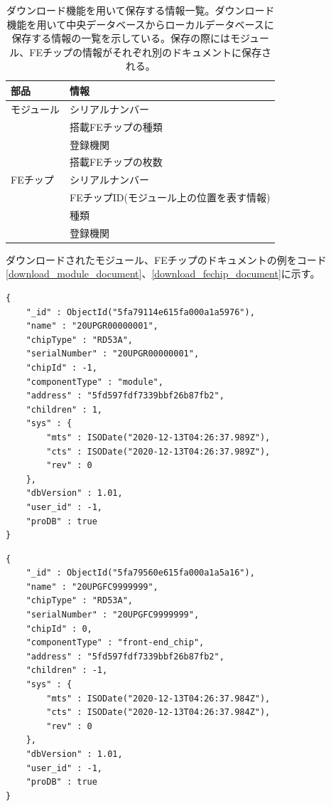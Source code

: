 \begin{table}[tbp]
\begin{center}
\caption[ダウンロード機能を用いて保存する情報一覧。]{ダウンロード機能を用いて保存する情報一覧。ダウンロード機能を用いて中央データベースからローカルデータベースに保存する情報の一覧を示している。保存の際にはモジュール、FEチップの情報がそれぞれ別のドキュメントに保存される。}
\label{download_information}
  \small
  \begin{tabular}{|ll|} \hline
    部品 & 情報 \\ \hline
    モジュール & シリアルナンバー \\ 
     & 搭載FEチップの種類  \\ 
     & 登録機関  \\ 
     & 搭載FEチップの枚数  \\ \hline 
    FEチップ & シリアルナンバー \\
     & FEチップID(モジュール上の位置を表す情報) \\  
     & 種類 \\ 
     & 登録機関 \\ \hline 
  \end{tabular}
\end{center}
\end{table}

ダウンロードされたモジュール、FEチップのドキュメントの例をコード\ref{download_module_document}、\ref{download_fechip_document}に示す。
\begin{lstlisting}[basicstyle=\scriptsize,caption=ダウンロードしたモジュール情報のドキュメントの例。ドキュメントが表\ref{download_information}の情報を持つことが分かる。,label=download_module_document]
{
	"_id" : ObjectId("5fa79114e615fa000a1a5976"),
	"name" : "20UPGR00000001",
	"chipType" : "RD53A",
	"serialNumber" : "20UPGR00000001",
	"chipId" : -1,
	"componentType" : "module",
	"address" : "5fd597fdf7339bbf26b87fb2",
	"children" : 1,
	"sys" : {
		"mts" : ISODate("2020-12-13T04:26:37.989Z"),
		"cts" : ISODate("2020-12-13T04:26:37.989Z"),
		"rev" : 0
	},
	"dbVersion" : 1.01,
	"user_id" : -1,
	"proDB" : true
}
\end{lstlisting}
\begin{lstlisting}[basicstyle=\scriptsize,caption=ダウンロードしたFEチップ情報のドキュメントの例。ドキュメントが表\ref{download_information}の情報を持つことが分かる。,label=download_fechip_document]
{
	"_id" : ObjectId("5fa79560e615fa000a1a5a16"),
	"name" : "20UPGFC9999999",
	"chipType" : "RD53A",
	"serialNumber" : "20UPGFC9999999",
	"chipId" : 0,
	"componentType" : "front-end_chip",
	"address" : "5fd597fdf7339bbf26b87fb2",
	"children" : -1,
	"sys" : {
		"mts" : ISODate("2020-12-13T04:26:37.984Z"),
		"cts" : ISODate("2020-12-13T04:26:37.984Z"),
		"rev" : 0
	},
	"dbVersion" : 1.01,
	"user_id" : -1,
	"proDB" : true
}
\end{lstlisting}

